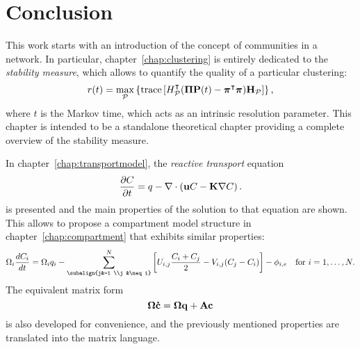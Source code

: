 \chapter*{Conclusion}
This work starts with an introduction of the concept of communities in a network. In particular, chapter~\ref{chap:clustering} is entirely dedicated to the \textit{stability measure}, which allows to quantify the quality of a particular clustering:
\[
	r(t) = \max_{\mathcal{P}} \left\{\operatorname{trace} \left[ \mathbf {\mathbf} H_{\mathcal{P}}^{\intercal}(\mathbf \Pi\mathbf P(t) - \boldsymbol \pi^{\intercal}\boldsymbol \pi)\mathbf H_{\mathcal{P}} \right]\right\},
\]
where $t$ is the Markov time, which acts as an intrinsic resolution parameter. This chapter is intended to be a standalone theoretical chapter providing a complete overview of the stability measure.

In chapter~\ref{chap:transportmodel}, the \textit{reactive transport} equation 
\[
	\frac{\partial C}{\partial t} = q-\nabla \cdot \left(\mathbf uC - \mathbf K \nabla C\right).
\]
is presented and the main properties of the solution to that equation are shown. This allows to propose a compartment model structure in chapter~\ref{chap:compartment} that exhibits similar properties:
\[
	\Omega_i \frac{dC_i}{dt} = \Omega_i q_i - \sum_{\subalign{j&=1 \\j &\neq i}}^N \left[ U_{i,j}\frac{C_i + C_j}{2} - V_{i,j} (C_j-C_i)\right] - \phi_{i,e} \quad \mbox{for } i=1,\dots,N.
\]
The equivalent matrix form
\[
	\boldsymbol \Omega \mathbf{\dot{c}} = \boldsymbol \Omega \mathbf q + \mathbf A \mathbf c
\]
is also developed for convenience, and the previously mentioned properties are translated into the matrix language.

